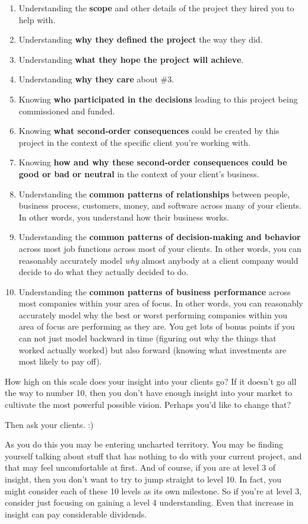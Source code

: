 \begin{enumerate}
\item Understanding the \textbf{scope} and other details of the project they hired you to help with.
\item Understanding \textbf{why they defined the project} the way they did.
\item Understanding \textbf{what they hope the project will achieve}.
\item Understanding \textbf{why they care} about \#3.
\item Knowing \textbf{who participated in the decisions} leading to this project being commissioned and funded.
\item Knowing \textbf{what second-order consequences} could be created by this project in the context of the specific client you're working with.
\item Knowing \textbf{how and why these second-order consequences could be good or bad or neutral} in the context of your client's business.
\item Understanding the \textbf{common patterns of relationships} between people, business process, customers, money, and software across many of your clients. In other words, you understand how their business works.
\item Understanding the \textbf{common patterns of decision-making and behavior} across most job functions across most of your clients. In other words, you can reasonably accurately model \emph{why} almost anybody at a client company would decide to do what they actually decided to do.
\item Understanding the \textbf{common patterns of business performance} across most companies within your area of focus. In other words, you can reasonably accurately model why the best or worst performing companies within you area of focus are performing as they are. You get lots of bonus points if you can not just model backward in time (figuring out why the things that worked actually worked) but also forward (knowing what investments are most likely to pay off).
\end{enumerate}

How high on this scale does your insight into your clients go? If it doesn't go all the way to number 10, then you don't have enough insight into your market to cultivate the most powerful possible vision. Perhaps you'd like to change that?

Then ask your clients. :)

As you do this you may be entering uncharted territory. You may be finding yourself talking about stuff that has nothing to do with your current project, and that may feel uncomfortable at first. And of course, if you are at level 3 of insight, then you don't want to try to jump straight to level 10. In fact, you might consider each of these 10 levels as its own milestone. So if you're at level 3, consider just focusing on gaining a level 4 understanding. Even that increase in insight can pay considerable dividends.

